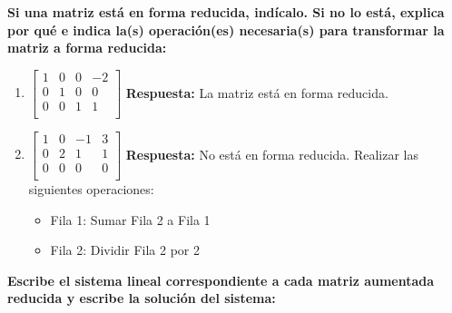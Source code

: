 \documentclass[answers]{exam} %
\begin{document}
\begin{questions}
	\question \large\textbf{Si una matriz está en forma reducida, indícalo. Si no lo está, explica por qué e indica la(s) operación(es) necesaria(s) para transformar la matriz a forma reducida:}

	\begin{enumerate}[label=\alph*.]
		\item $\displaystyle
			      \left[
				      \begin{array}{ccc|c}
					      {1} & {0} & {0} & -2 \\
					      {0} & {1} & {0} & 0  \\
					      {0} & {0} & {1} & 1  \\
				      \end{array}
				      \right]
		      $
		      \vspace{0.5cm}
		      \textbf{Respuesta:} La matriz está en forma reducida.
		\item $\displaystyle
			      \left[
				      \begin{array}{ccc|c}
					      {1} & {0} & {-1} & 3 \\
					      {0} & {2} & {1}  & 1 \\
					      {0} & {0} & {0}  & 0 \\
				      \end{array}
				      \right]
		      $
		      \vspace{0.5cm}
		      \textbf{Respuesta:} No está en forma reducida. Realizar las siguientes operaciones:
		      \begin{itemize}
			      \item Fila 1: Sumar Fila 2 a Fila 1
			      \item Fila 2: Dividir Fila 2 por 2
		      \end{itemize}
	\end{enumerate}

	\vspace{0.5cm}
	\question \large\textbf{Escribe el sistema lineal correspondiente a cada matriz aumentada reducida y escribe la solución del sistema:}


\end{questions}
\end{document}
